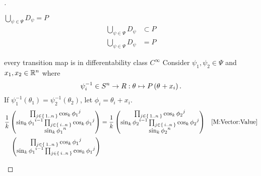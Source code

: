 \documentclass[../main.tex]{subfiles}
\begin{document}
\begin{proof}[]
\begin{subproof}{$\bigcup_{\psi\in\Psi} D_\psi = P$}
\begin{align*}
            \bigcup_{\psi\in\Psi}D_\psi  & \subset P                                                                  \\
            \bigcup_{\psi\in\Psi} D_\psi & = P
        \end{align*}
    \end{subproof}
    \begin{subproof}{every transition map is in differentability class $C^\infty$}
        Consider $\psi_1, \psi_2 \in \Psi$ and $x_1, x_2 \in \mathbb{R}^n$ where
        \begin{equation*}
            \psi_i^{-1}
            \in S^n \to R
            :\tensor{\theta}{}\mapsto P\left(\tensor{\theta}{}+x_i\right)
            \text{.}
        \end{equation*}
        If $\psi_1^{-1}\left(\theta_1\right)=\psi_2^{-1}\left(\theta_2\right)$,
        let $\phi_i = \theta_i+x_i$.
        \begin{align*}
            \frac{1}{k}
            \begin{pmatrix}
                \prod_{j\in\Set{1..n}}{\cos_k{\tensor{{\phi_1}}{^j}}}                                  \\
                \sin_k{\tensor{{\phi_1}}{^{i-1}}}\prod_{j\in\Set{i..n}}{\cos_k{\tensor{{\phi_1}}{^j}}} \\
                \sin_k{{\tensor{{\phi_1}}{^n}}}                                                        \\
            \end{pmatrix}
                                                                                                                      & =
            \frac{1}{k}
            \begin{pmatrix}
                \prod_{j\in\Set{1..n}}{\cos_k{\tensor{{\phi_2}}{^j}}}                                  \\
                \sin_k{\tensor{{\phi_2}}{^{i-1}}}\prod_{j\in\Set{i..n}}{\cos_k{\tensor{{\phi_2}}{^j}}} \\
                \sin_k{{\tensor{{\phi_2}}{^n}}}                                                        \\
            \end{pmatrix} & \text{\cref{M:Vector:Value}}        \\
            \begin{pmatrix}
                \prod_{j\in\Set{1..n}}{\cos_k{\tensor{{\phi_1}}{^j}}}                                  \\
                \sin_k{\tensor{{\phi_1}}{^{i-1}}}\prod_{j\in\Set{i..n}}{\cos_k{\tensor{{\phi_1}}{^j}}} \\

\end{pmatrix}
\end{align*}
\end{subproof}
\end{proof}
\end{document}
